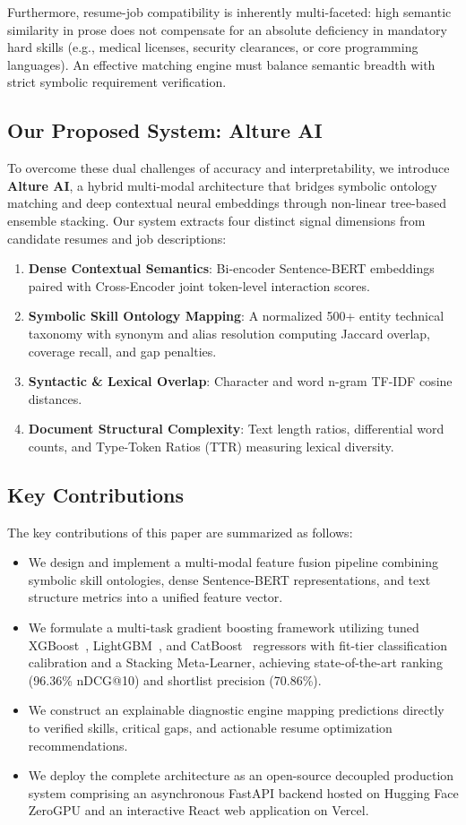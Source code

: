 \documentclass[conference]{IEEEtran}
\begin{document}
Furthermore, resume-job compatibility is inherently multi-faceted: high semantic similarity in prose does not compensate for an absolute deficiency in mandatory hard skills (e.g., medical licenses, security clearances, or core programming languages). An effective matching engine must balance semantic breadth with strict symbolic requirement verification.

\subsection{Our Proposed System: Alture AI}
To overcome these dual challenges of accuracy and interpretability, we introduce \textbf{Alture AI}, a hybrid multi-modal architecture that bridges symbolic ontology matching and deep contextual neural embeddings through non-linear tree-based ensemble stacking. Our system extracts four distinct signal dimensions from candidate resumes and job descriptions:
\begin{enumerate}
    \item \textbf{Dense Contextual Semantics}: Bi-encoder Sentence-BERT embeddings paired with Cross-Encoder joint token-level interaction scores.
    \item \textbf{Symbolic Skill Ontology Mapping}: A normalized 500+ entity technical taxonomy with synonym and alias resolution computing Jaccard overlap, coverage recall, and gap penalties.
    \item \textbf{Syntactic \& Lexical Overlap}: Character and word n-gram TF-IDF cosine distances.
    \item \textbf{Document Structural Complexity}: Text length ratios, differential word counts, and Type-Token Ratios (TTR) measuring lexical diversity.
\end{enumerate}

\subsection{Key Contributions}
The key contributions of this paper are summarized as follows:
\begin{itemize}
    \item We design and implement a multi-modal feature fusion pipeline combining symbolic skill ontologies, dense Sentence-BERT representations, and text structure metrics into a unified feature vector.
    \item We formulate a multi-task gradient boosting framework utilizing tuned XGBoost~\cite{chen2016}, LightGBM~\cite{ke2017lightgbm}, and CatBoost~\cite{prokhorenkova2018catboost} regressors with fit-tier classification calibration and a Stacking Meta-Learner, achieving state-of-the-art ranking (96.36\% nDCG@10) and shortlist precision (70.86\%).
    \item We construct an explainable diagnostic engine mapping predictions directly to verified skills, critical gaps, and actionable resume optimization recommendations.
    \item We deploy the complete architecture as an open-source decoupled production system comprising an asynchronous FastAPI backend hosted on Hugging Face ZeroGPU and an interactive React web application on Vercel.
\end{itemize}
\end{document}
